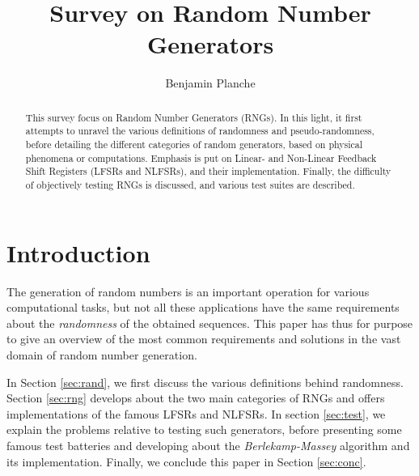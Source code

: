 \documentclass{llncs}
\begin{document}
\title{Survey on Random Number Generators}
%
%
\author{Benjamin Planche}
%
%
%

\maketitle              %

\begin{abstract}
This survey focus on Random Number Generators (RNGs). In this light, it first attempts to unravel the various definitions of randomness and pseudo-randomness, before detailing the different categories of random generators, based on physical phenomena or computations. Emphasis is put on Linear- and Non-Linear Feedback Shift Registers (LFSRs and NLFSRs), and their implementation. Finally, the difficulty of objectively testing RNGs is discussed, and various test suites are described.
\end{abstract}
%
\section{Introduction}
%
The generation of random numbers is an important operation for various computational tasks, but not all these applications have the same requirements about the \emph{randomness} of the obtained sequences. This paper has thus for purpose to give an overview of the most common requirements and solutions in the vast domain of random number generation.

In Section \ref{sec:rand}, we first discuss the various definitions behind randomness. Section \ref{sec:rng} develops about the two main categories of RNGs and offers implementations of the famous LFSRs and NLFSRs. In section \ref{sec:test}, we explain the problems relative to testing such generators, before presenting some famous test batteries and developing about the \emph{Berlekamp-Massey} algorithm and its implementation. Finally, we conclude this paper in Section \ref{sec:conc}.
\end{document}
